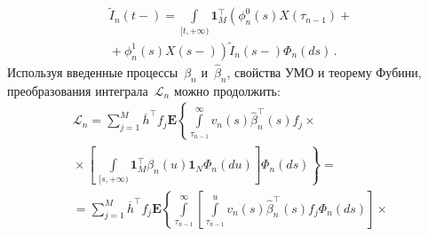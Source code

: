 \begin{multicols}{2}
{\noindent
\begin{multline*}
 \widetilde{I}_{n}(t-)=\int\limits_{[t,+\infty)}\mathbf{1}_M^{\top}\left(
 \phi^0_n(s)X(\tau_{n-1})+{}\right.\\
\left. {}+\phi^1_n(s)X(s-)\right)\widetilde{I}_{n}(s-)\Phi_n(ds)\,.
\end{multline*}
 Используя введенные процессы~$\beta_n$ и~$\widehat{\beta}_n$, свойства УМО
 и теорему Фубини, преобразования интеграла~$\mathcal{L}_n$ можно продолжить:
 \begin{multline*}
\mathcal{L}_n =
\sum\limits_{j=1}^M \overline{h}^{\top}f_j
\mathbf{E}\left\{\int\limits_{\tau_{n-1}}^{\infty}v_n(s)\widehat{\beta}^{\top}_n(s)
f_j \times{}\right.\\
\left.{}\times\left[\,\int\limits_{[s,+\infty)}\mathbf{1}_M^{\top}\beta_n(u)\mathbf{1}_N
\Phi_n(du)\right] \Phi_n(ds)\right\}={}\\
{}=
\sum\limits_{j=1}^M \overline{h}^{\top}f_j
\mathbf{E}\left\{\int\limits_{\tau_{n-1}}^{\infty} \left[
\int\limits_{\tau_{n-1}}^u v_n(s)\widehat{\beta}^{\top}_n(s)
f_j\Phi_n(ds) \right]\times{}\right.
\end{multline*}

}
\end{multicols}
